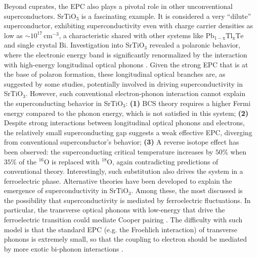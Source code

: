 \documentclass[11pt]{article}
\begin{document}
Beyond cuprates, the EPC also plays a pivotal role in other unconventional superconductors. 
SrTiO$_{3}$ is a fascinating example. It is considered a very ``dilute'' superconductor, exhibiting
superconductivity even with charge carrier densities as low as $\sim 10^{17}\,\mathrm{cm^{-3}}$\cite{schooley_superconductivity_1964,lin_fermi_2013}, a characteristic shared with other systems like $\mathrm{Pb_{1-x}Tl_{x}Te}$\cite{known} and single crystal $\mathrm{Bi}$\cite{prakash_evidence_2017}. 
Investigation into SrTiO$_{3}$ revealed a polaronic behavior, where the electronic energy band is significantly renormalized by the interaction with high-energy longitudinal optical phonons \cite{swartz_polaronic_2018, geondzhian_large_2020}.
Given the strong EPC that is at the base of polaron formation, these longitudinal optical branches are, as suggested by some studies\cite{gastiasoro_supercondutivity_2020}, potentially involved in driving superconductivity in SrTiO$_{3}$.
However, such conventional electron-phonon interaction cannot explain the superconducting behavior in SrTiO$_{3}$: 
\textbf{(1)} BCS theory requires a higher Fermi energy compared to the phonon energy, which is not satisfied in this system;
\textbf{(2)} Despite strong interactions between longitudinal optical phonons and electrons, the relatively small superconducting gap suggests a weak effective EPC, diverging from conventional superconductor's behavior\cite{swartz_polaronic_2018}; 
\textbf{(3)} A reverse isotope effect has been observed: the superconducting critical temperature increases by $50\%$  when $35\%$ of the ${}^{16}\mathrm{O}$ is replaced with ${}^{18}\mathrm{O}$\cite{stucky_isotope_2016}, again contradicting predictions of conventional theory. Interestingly, such substitution also drives the system in a ferroelectric phase\cite{stucky_isotope_2016}.
Alternative theories have been developed to explain the emergence of superconductivity in SrTiO$_{3}$. Among these, the most discussed is the possibility that superconductivity is mediated by ferroelectric fluctuations. In particular, the transverse optical phonons with low-energy that drive the ferroelectric transition could mediate Cooper pairing \cite{gastiasoro_supercondutivity_2020}. The difficulty with such model is that the standard EPC (e.g. the Froehlich interaction) of transverse phonons is extremely small, so that the coupling to electron should be mediated by more exotic bi-phonon interactions \cite{gastiasoro_phonon-mediated_2019}.
\end{document}
